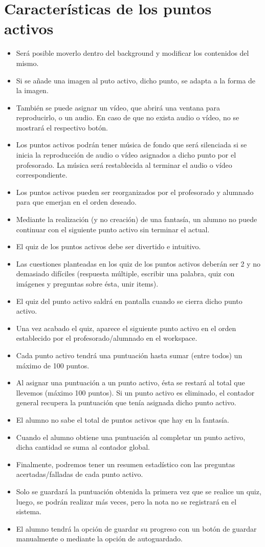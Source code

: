 \section{Características de los puntos activos}
\begin{itemize}
	\item Será posible moverlo dentro del background y modificar los contenidos del mismo.
	\item Si se añade una imagen al puto activo, dicho punto, se adapta a la forma de la imagen.
	\item También se puede asignar un vídeo, que abrirá una ventana para reproducirlo, o un audio. En caso de que no exista audio o vídeo, no se mostrará el respectivo botón.
	\item Los puntos activos podrán tener música de fondo que será silenciada si se inicia la reproducción de audio o vídeo asignados a dicho punto por el profesorado. La música será restablecida al terminar el audio o vídeo correspondiente.
	\item Los puntos activos pueden ser reorganizados por el profesorado y alumnado para que emerjan en el orden deseado.
	\item Mediante la realización (y no creación) de una fantasía, un alumno no puede continuar con el siguiente punto activo sin terminar el actual.
	\item El quiz de los puntos activos debe ser divertido e intuitivo.
	\item Las cuestiones planteadas en los quiz de los puntos activos deberán ser 2 y no demasiado difíciles (respuesta múltiple, escribir una palabra, quiz con imágenes y preguntas sobre ésta, unir items).
	\item El quiz del punto activo saldrá en pantalla cuando se cierra dicho punto activo.
	\item Una vez acabado el quiz, aparece el siguiente punto activo en el orden establecido por el profesorado/alumnado en el workspace.
	\item Cada punto activo tendrá una puntuación hasta sumar (entre todos) un máximo de 100 puntos.
	\item Al asignar una puntuación a un punto activo, ésta se restará al total que llevemos (máximo 100 puntos). Si un punto activo es eliminado, el contador general recupera la puntuación que tenía asignada dicho punto activo.
	\item El alumno no sabe el total de puntos activos que hay en la fantasía.
	\item Cuando el alumno obtiene una puntuación al completar un punto activo, dicha cantidad se suma al contador global.
	\item Finalmente, podremos tener un resumen estadístico con las preguntas acertadas/falladas de cada punto activo.
	\item Solo se guardará la puntuación obtenida la primera vez que se realice un quiz, luego, se podrán realizar más veces, pero la nota no se registrará en el sistema.
	\item El alumno tendrá la opción de guardar su progreso con un botón de guardar manualmente o mediante la opción de autoguardado.
\end{itemize}

